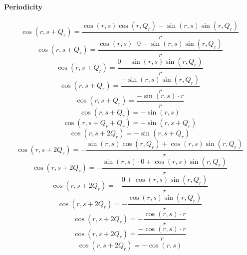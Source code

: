 \documentclass[a4paper,12pt]{report}
\begin{document}
\paragraph{Periodicity}
\begin{equation}
\cos(r,s + Q_r) = \frac{\cos(r,s) \cos(r,Q_r) - \sin(r,s) \sin(r,Q_r)}{r}
\end{equation}
\begin{equation}
\cos(r,s + Q_r) = \frac{\cos(r,s) \cdot 0 - \sin(r,s) \sin(r,Q_r)}{r}
\end{equation}
\begin{equation}
\cos(r,s + Q_r) = \frac{0 - \sin(r,s) \sin(r,Q_r)}{r}
\end{equation}
\begin{equation}
\cos(r,s + Q_r) = \frac{-\sin(r,s) \sin(r,Q_r)}{r}
\end{equation}
\begin{equation}
\cos(r,s + Q_r) = \frac{-\sin(r,s) \cdot r}{r}
\end{equation}
\begin{equation}
\cos(r,s + Q_r) = -\sin(r,s)
\end{equation}
\begin{equation}
\cos(r,s + Q_r + Q_r) = -\sin(r,s + Q_r)
\end{equation}
\begin{equation}
\cos(r,s + 2Q_r) = -\sin(r,s + Q_r)
\end{equation}
\begin{equation}
\cos(r,s + 2Q_r) = -\frac{\sin(r,s) \cos(r,Q_r) + \cos(r,s) \sin(r,Q_r)}{r}
\end{equation}
\begin{equation}
\cos(r,s + 2Q_r) = -\frac{\sin(r,s) \cdot 0 + \cos(r,s) \sin(r,Q_r)}{r}
\end{equation}
\begin{equation}
\cos(r,s + 2Q_r) = -\frac{0 + \cos(r,s) \sin(r,Q_r)}{r}
\end{equation}
\begin{equation}
\cos(r,s + 2Q_r) = -\frac{\cos(r,s) \sin(r,Q_r)}{r}
\end{equation}
\begin{equation}
\cos(r,s + 2Q_r) = -\frac{\cos(r,s) \cdot r}{r}
\end{equation}
\begin{equation}
\cos(r,s + 2Q_r) = \frac{-\cos(r,s) \cdot r}{r}
\end{equation}
\begin{equation}
\cos(r,s + 2Q_r) = -\cos(r,s)
\end{equation}
\end{document}
